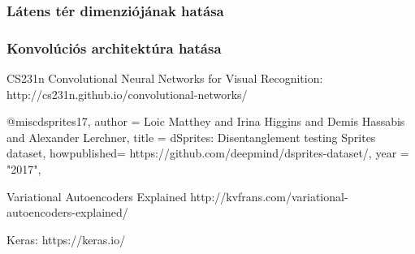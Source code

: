 \documentclass[12pt]{article}
\begin{document}
\subsubsection{Látens tér dimenziójának hatása}



\subsubsection{Konvolúciós architektúra hatása}


\begin{thebibliography}{9}

CS231n Convolutional Neural Networks for Visual Recognition:
http://cs231n.github.io/convolutional-networks/

@misc{dsprites17,
author = {Loic Matthey and Irina Higgins and Demis Hassabis and Alexander Lerchner},
title = {dSprites: Disentanglement testing Sprites dataset},
howpublished= {https://github.com/deepmind/dsprites-dataset/},
year = "2017",
}

Variational Autoencoders Explained
http://kvfrans.com/variational-autoencoders-explained/

Keras:
https://keras.io/

\end{thebibliography}
\end{document}
